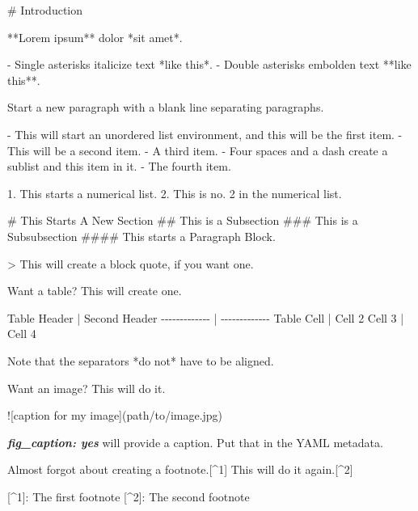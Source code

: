 \documentclass[11pt,]{article}
\newenvironment{Shaded}{\begin{snugshade}}{\end{snugshade}}
\newcommand{\AlertTok}[1]{\textcolor[rgb]{0.94,0.16,0.16}{#1}}
\newcommand{\AttributeTok}[1]{\textcolor[rgb]{0.77,0.63,0.00}{#1}}
\newcommand{\FunctionTok}[1]{\textcolor[rgb]{0.00,0.00,0.00}{#1}}
\newcommand{\InformationTok}[1]{\textcolor[rgb]{0.56,0.35,0.01}{\textbf{\textit{#1}}}}
\newcommand{\NormalTok}[1]{#1}
\newcommand{\OtherTok}[1]{\textcolor[rgb]{0.56,0.35,0.01}{#1}}
\newcommand{\SpecialStringTok}[1]{\textcolor[rgb]{0.31,0.60,0.02}{#1}}
\begin{document}
\begin{Shaded}
\begin{Highlighting}[]

\FunctionTok{\# Introduction}

\NormalTok{**Lorem ipsum** dolor *sit amet*. }

\SpecialStringTok{{-} }\NormalTok{Single asterisks italicize text *like this*. }
\SpecialStringTok{{-} }\NormalTok{Double asterisks embolden text **like this**.}

\NormalTok{Start a new paragraph with a blank line separating paragraphs.}

\SpecialStringTok{{-} }\NormalTok{This will start an unordered list environment, and this will be the first item.}
\SpecialStringTok{{-} }\NormalTok{This will be a second item.}
\SpecialStringTok{{-} }\NormalTok{A third item.}
\SpecialStringTok{    {-} }\NormalTok{Four spaces and a dash create a sublist and this item in it.}
\SpecialStringTok{{-} }\NormalTok{The fourth item.}
    
\SpecialStringTok{1. }\NormalTok{This starts a numerical list.}
\SpecialStringTok{2. }\NormalTok{This is no. 2 in the numerical list.}
    
\FunctionTok{\# This Starts A New Section}
\FunctionTok{\#\# This is a Subsection}
\FunctionTok{\#\#\# This is a Subsubsection}
\FunctionTok{\#\#\#\# This starts a Paragraph Block.}

\AttributeTok{\textgreater{} This will create a block quote, if you want one.}

\NormalTok{Want a table? This will create one.}

\NormalTok{Table Header  | Second Header}
\NormalTok{{-}{-}{-}{-}{-}{-}{-}{-}{-}{-}{-}{-}{-} | {-}{-}{-}{-}{-}{-}{-}{-}{-}{-}{-}{-}{-}}
\NormalTok{Table Cell    | Cell 2}
\NormalTok{Cell 3        | Cell 4 }

\NormalTok{Note that the separators *do not* have to be aligned.}

\NormalTok{Want an image? This will do it.}

\AlertTok{![caption for my image](path/to/image.jpg)}

\InformationTok{\textasciigrave{}fig\_caption: yes\textasciigrave{}}\NormalTok{ will provide a caption. Put that in the YAML metadata.}

\NormalTok{Almost forgot about creating a footnote.}\OtherTok{[\^{}1]}\NormalTok{ This will do it again.}\OtherTok{[\^{}2]}

\OtherTok{[\^{}1]: }\NormalTok{The first footnote}
\OtherTok{[\^{}2]: }\NormalTok{The second footnote}


\end{Highlighting}
\end{Shaded}
\end{document}
